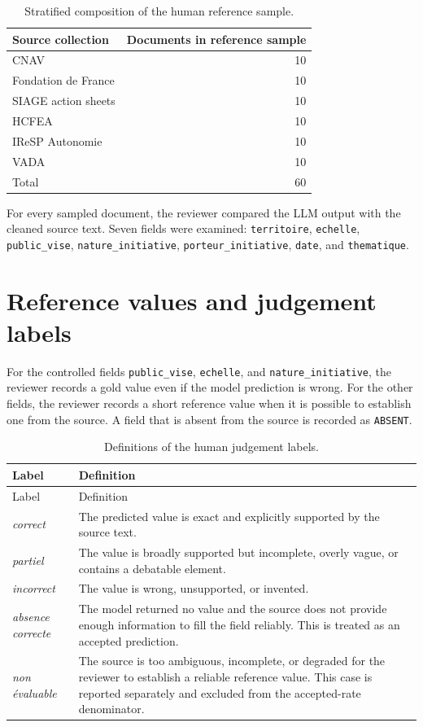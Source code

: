 \begin{table}[H]
\centering
\begin{tabular}{lr}
\toprule
Source collection & Documents in reference sample \\
\midrule
CNAV & 10 \\
Fondation de France & 10 \\
SIAGE action sheets & 10 \\
HCFEA & 10 \\
IReSP Autonomie & 10 \\
VADA & 10 \\
\midrule
Total & 60 \\
\bottomrule
\end{tabular}
\caption{Stratified composition of the human reference sample.}
\label{tab:appendix-evaluation-sample}
\end{table}

For every sampled document, the reviewer compared the LLM output with the
cleaned source text. Seven fields were examined: \texttt{territoire},
\texttt{echelle}, \texttt{public\_vise}, \texttt{nature\_initiative},
\texttt{porteur\_initiative}, \texttt{date}, and \texttt{thematique}.

\section{Reference values and judgement labels}

For the controlled fields \texttt{public\_vise}, \texttt{echelle}, and
\texttt{nature\_initiative}, the reviewer records a gold value even if the
model prediction is wrong. For the other fields, the reviewer records a short
reference value when it is possible to establish one from the source. A field
that is absent from the source is recorded as \texttt{ABSENT}.

\begin{longtable}{p{3cm}p{11cm}}
\caption{Definitions of the human judgement labels.}
\label{tab:appendix-judgement-labels}\\
\toprule
Label & Definition \\
\midrule
\endfirsthead
\toprule
Label & Definition \\
\midrule
\endhead
\bottomrule
\endfoot
\textit{correct} & The predicted value is exact and explicitly supported by the source text. \\
\textit{partiel} & The value is broadly supported but incomplete, overly vague, or contains a debatable element. \\
\textit{incorrect} & The value is wrong, unsupported, or invented. \\
\textit{absence correcte} & The model returned no value and the source does not provide enough information to fill the field reliably. This is treated as an accepted prediction. \\
\textit{non évaluable} & The source is too ambiguous, incomplete, or degraded for the reviewer to establish a reliable reference value. This case is reported separately and excluded from the accepted-rate denominator. \\
\end{longtable}


